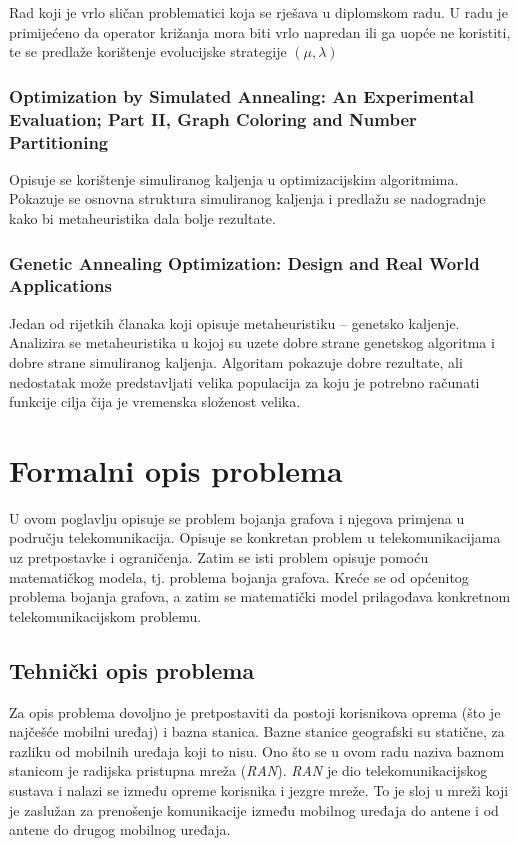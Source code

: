 \documentclass[times, utf8, diplomski, numeric]{fer}
\begin{document}
Rad koji je vrlo sličan problematici koja se rješava u diplomskom radu. U radu je primijećeno da operator križanja mora biti vrlo napredan ili ga uopće ne koristiti, te se predlaže korištenje evolucijske strategije $(\mu, \lambda)$ 

\subsection*{Optimization by Simulated Annealing: An Experimental Evaluation; Part II, Graph Coloring and Number Partitioning \cite{lit13}}

Opisuje se korištenje simuliranog kaljenja u optimizacijskim algoritmima. Pokazuje se osnovna struktura simuliranog kaljenja i predlažu se nadogradnje kako bi metaheuristika dala bolje rezultate.

\subsection*{Genetic Annealing Optimization: Design and Real World Applications \cite{lit18}}

Jedan od rijetkih članaka koji opisuje metaheuristiku -- genetsko kaljenje. Analizira se metaheuristika u kojoj su uzete dobre strane genetskog algoritma i dobre strane simuliranog kaljenja. Algoritam pokazuje dobre rezultate, ali nedostatak može predstavljati velika populacija za koju je potrebno računati funkcije cilja čija je vremenska složenost velika.


\chapter{Formalni opis problema}

U ovom poglavlju opisuje se problem bojanja grafova i njegova primjena u području telekomunikacija. Opisuje se konkretan problem u telekomunikacijama uz pretpostavke i ograničenja. Zatim se isti problem opisuje pomoću matematičkog modela, tj. problema bojanja grafova. Kreće se od općenitog problema bojanja grafova, a zatim se matematički model prilagođava konkretnom telekomunikacijskom problemu.

\section{Tehnički opis problema}

Za opis problema dovoljno je pretpostaviti da postoji korisnikova oprema (što je najčešće mobilni uređaj) i bazna stanica. Bazne stanice geografski su statične, za razliku od mobilnih uređaja koji to nisu.
Ono što se u ovom radu naziva baznom stanicom je radijska pristupna mreža  (\emph{RAN}). \emph{RAN} je dio telekomunikacijskog sustava i nalazi se između opreme korisnika i jezgre mreže. To je sloj u mreži koji je zaslužan za prenošenje komunikacije između mobilnog uređaja do antene i od antene do drugog mobilnog uređaja. 
\end{document}

